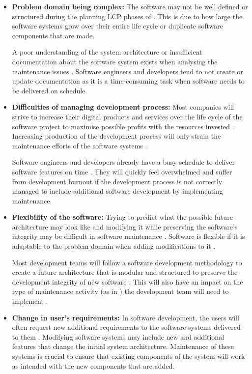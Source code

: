 \begin{itemize}
	\item \textbf{Problem domain being complex:} The software may not be well defined or structured during the planning LCP phases of . This is due to how large the software systems grow over their entire life cycle or duplicate software components that are made.\par A poor understanding of the system architecture or insufficient documentation about the software system exists when analysing the maintenance issues \cite{Galster2019}. Software engineers and developers tend to not create or update documentation as it is a time-consuming task when software needs to be delivered on schedule.
	\item \textbf{Difficulties of managing development process:} Most companies will strive to increase their digital products and services over the life cycle of the software project to maximise possible profits with the resources invested \cite{Niu2018}. Increasing production of the development process will only strain the maintenance efforts of the software systems \cite{Sneed2004}.\par Software engineers and developers already have a busy schedule to deliver software features on time \cite{Galster2019, Lenarduzzi2017}. They will quickly feel overwhelmed and suffer from development burnout if the development process is not correctly managed to include additional software development by implementing maintenance.
	\item \textbf{Flexibility of the software:} Trying to predict what the possible future architecture may look like and modifying it while preserving the software's integrity may be difficult in software maintenance \cite{Garlan1999}. Software is flexible if it is adaptable to the problem domain when adding modifications to it \cite{Ogheneovo2014}.\par Most development teams will follow a software development methodology to create a future architecture that is modular and structured to preserve the development integrity of new software \cite{Vijayasarathy2016}. This will also have an impact on the type of maintenance activity (as in ) the development team will need to implement \cite{Thamburaj2017, Snipes2018}.
	\item \textbf{Change in user's requirements:} In software development, the users will often request new additional requirements to the software systems delivered to them \cite{Ogheneovo2014}. Modifying software systems may include new and additional features that change the initial system architecture. Maintenance of these systems is crucial to ensure that existing components of the system will work as intended with the new components that are added.

\end{itemize}
